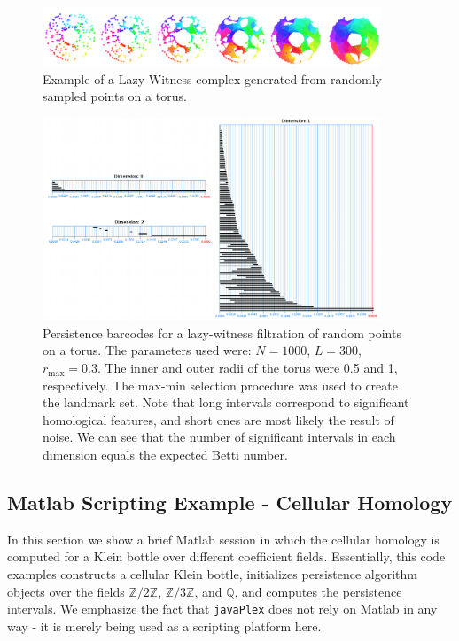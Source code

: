 \documentclass{gts2012}
\newcommand\javaPlex{\texttt{javaPlex}\xspace}
\begin{document}
\begin{figure}
\centering
\includegraphics[width=0.9\textwidth]{images/tori_small.png}
\caption{Example of a Lazy-Witness complex generated from randomly sampled points on a torus.} \label{lwtorus}
\end{figure}

\begin{figure}
\centering
\includegraphics[width=0.9\textwidth]{images/barcodes_small.png}
\caption{Persistence barcodes for a lazy-witness filtration of random points on a torus. The parameters used were: $N = 1000$, $L = 300$, $r_{\max} = 0.3$. The inner and outer radii of the torus were 0.5 and 1, respectively. The max-min selection procedure was used to create the landmark set. Note that long intervals correspond to significant homological features, and short ones are most likely the result of noise. We can see that the number of significant intervals in each dimension equals the expected Betti number.} \label{lwtorusbarcodes}
\end{figure}

\subsection{Matlab Scripting Example - Cellular Homology}

In this section we show a brief Matlab session in which the cellular homology is computed for a Klein bottle over different coefficient fields. Essentially, this code examples constructs a cellular Klein bottle, initializes persistence algorithm objects over the fields $\mathbb{Z}/2\mathbb{Z}$, $\mathbb{Z}/3\mathbb{Z}$, and $\mathbb{Q}$, and computes the persistence intervals. We emphasize the fact that \javaPlex does not rely on Matlab in any way - it is merely being used as a scripting platform here.
\end{document}
